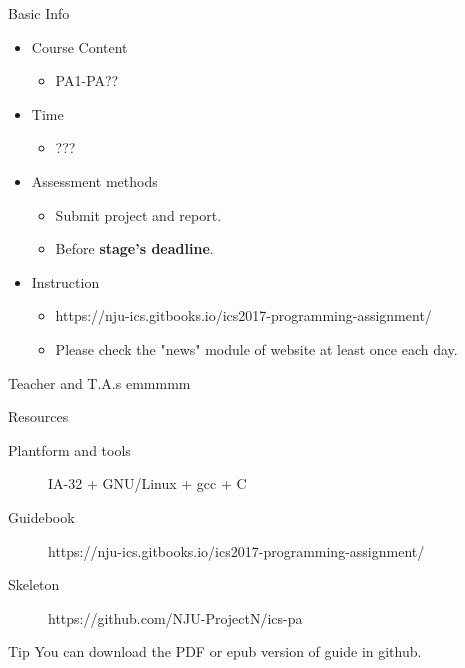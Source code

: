 \documentclass[handout]{beamer}
\title{\titletext}
\subtitle{Introduction}
\author{Xie}
\institute{xiemhemail@gmail.com}
\date{Sep ??, 2017}
\begin{document}
	\maketitle
	
\begin{frame}{Basic Info}
	\begin{itemize}
		\item Course Content
		\begin{itemize}
			\item PA1-PA??
		\end{itemize}
		\item Time
		\begin{itemize}
			\item ???
		\end{itemize}
		\item Assessment methods
			\begin{itemize}
				\item Submit project and report.
				\item Before \textbf{stage's deadline}.
			\end{itemize}
		\item \alert{Instruction}
		\begin{itemize}
			\item https://nju-ics.gitbooks.io/ics2017-programming-assignment/
			\item \alert\huge Please check the "news" module of website at least once each day.
		\end{itemize}
	\end{itemize}
\end{frame}

\begin{frame}{Teacher and T.A.s}
	emmmmm
\end{frame}

\begin{frame}{Resources}
	\begin{description}
		\item [Plantform and tools] IA-32 + GNU/Linux + gcc + C	
		\item [Guidebook] https://nju-ics.gitbooks.io/ics2017-programming-assignment/
		\item [Skeleton]https://github.com/NJU-ProjectN/ics-pa
	\end{description}
	\begin{alertblock}{Tip}
		You can download the PDF or epub version of guide in github.
	\end{alertblock}
\end{frame}
\end{document}
